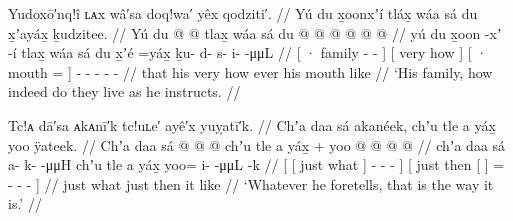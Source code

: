 

\ex\label{ex:100-193-family-lives-per-him}%
%
\begingl
	\glpreamble	Yudoxō′nq!î ʟᴀx wâ′sa doq!wa′ yêx qodziti′. //
	\glpreamble	Yú du x̱oonxʼí tláx̱ wáa sá du x̱ʼayáx̱ ḵudzitee. //
	\gla	{} Yú du  @ {} @ {} {}
		{} tlax̱ wáa sá {}
		{} du  @ {} {}
		 @ {} @ {} @ {} @ {} @ {} //
	\glb	{} yú du x̱oon -xʼ -í {}
		{} tlax̱ wáa sá {}
		{} du x̱ʼé =yáx̱ {}
		ḵu- d- s- i-  -μμL //
	\glc	{}[  · family - - {}]
		{}[ very how  {}]
		{}[ · mouth = {}]
		- - - -  - //
	\gld	{} that his  {} {} {}
		{} very how ever {}
		{}  his mouth \•like {}
		 {} {} {} {} {} //
	\glft	‘His family, how indeed do they live as he instructs.
		//
\endgl
\xe

\ex\label{ex:100-194-whatever-he-says-it-is-so}%
%
\begingl
	\glpreamble	Tc!ᴀ dā′sa ᴀkᴀnī′k tc!uʟe′ ayê′x yuỵatī′k. //
	\glpreamble	Chʼa daa sá akanéek, chʼu tle a yáx̱ yoo ÿateek. //
	\gla	{} {} Chʼa daa sá {} 
			 @ {} @ {} @ {} {}
		{} chʼu tle 
			{} a yáx̱ {} +
			yoo @  @ {} @ {} @ {} {} //
	\glb	{} {} chʼa daa sá {} 
			a- k-  -μμH {}
		{} chʼu tle 
			{} a yáx̱ {} 
			yoo= i-  -μμL -k {} //
	\glc	{}[ {}[ just what  {}]
			- -  - {}]
		{}[ just then 
			{}[   {}]
			= -  - - {}] //
	\gld	{} {} just what  {} 
			 {} {} {} {}
		{} just then
			{} it like {} 
			  {} {} {} {} //
	\glft	‘Whatever he foretells, that is the way it is.’
		//
\endgl
\xe

